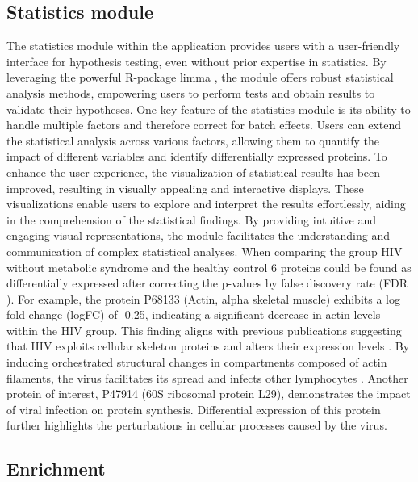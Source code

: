 \documentclass[
  11pt,
]{article}
\begin{document}
\hypertarget{statistics-module}{%
\subsection{Statistics module}\label{statistics-module}}

The statistics module within the application provides users with a
user-friendly interface for hypothesis testing, even without prior
expertise in statistics. By leveraging the powerful R-package limma
\citep{Ritchie2015}, the module offers robust statistical analysis
methods, empowering users to perform tests and obtain results to
validate their hypotheses. One key feature of the statistics module is
its ability to handle multiple factors and therefore correct for batch
effects. Users can extend the statistical analysis across various
factors, allowing them to quantify the impact of different variables and
identify differentially expressed proteins. To enhance the user
experience, the visualization of statistical results has been improved,
resulting in visually appealing and interactive displays. These
visualizations enable users to explore and interpret the results
effortlessly, aiding in the comprehension of the statistical findings.
By providing intuitive and engaging visual representations, the module
facilitates the understanding and communication of complex statistical
analyses. When comparing the group HIV without metabolic syndrome and
the healthy control 6 proteins could be found as differentially
expressed after correcting the p-values by false discovery rate (FDR
\citep{Benjamini1995}). For example, the protein P68133 (Actin, alpha
skeletal muscle) exhibits a log fold change (logFC) of -0.25, indicating
a significant decrease in actin levels within the HIV group. This
finding aligns with previous publications suggesting that HIV exploits
cellular skeleton proteins and alters their expression levels
\citep{Turville2018}. By inducing orchestrated structural changes in
compartments composed of actin filaments, the virus facilitates its
spread and infects other lymphocytes \citep{Rodrigues2022}. Another
protein of interest, P47914 (60S ribosomal protein L29), demonstrates
the impact of viral infection on protein synthesis. Differential
expression of this protein further highlights the perturbations in
cellular processes caused by the virus.

\hypertarget{enrichment}{%
\subsection{Enrichment}\label{enrichment}}
\end{document}
